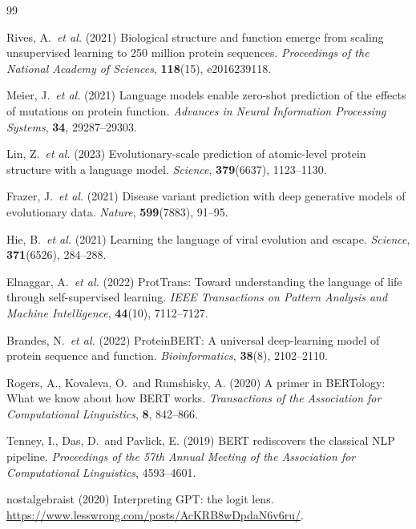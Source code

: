 \documentclass[numbered,webpdf,modern,large]{oup-authoring-template}
\newcommand{\rone}[1]{#1}
\begin{document}
\newpage
\begin{thebibliography}{99}


Rives, A.\ \textit{et al.} (2021)
Biological structure and function emerge from scaling unsupervised learning to 250
million protein sequences.
\textit{Proceedings of the National Academy of Sciences}, \textbf{118}(15), e2016239118.

Meier, J.\ \textit{et al.} (2021)
Language models enable zero-shot prediction of the effects of mutations on protein
function.
\textit{Advances in Neural Information Processing Systems}, \textbf{34}, 29287--29303.

Lin, Z.\ \textit{et al.} (2023)
Evolutionary-scale prediction of atomic-level protein structure with a language model.
\textit{Science}, \textbf{379}(6637), 1123--1130.

Frazer, J.\ \textit{et al.} (2021)
Disease variant prediction with deep generative models of evolutionary data.
\textit{Nature}, \textbf{599}(7883), 91--95.

Hie, B.\ \textit{et al.} (2021)
Learning the language of viral evolution and escape.
\textit{Science}, \textbf{371}(6526), 284--288.

Elnaggar, A.\ \textit{et al.} (2022)
ProtTrans: Toward understanding the language of life through self-supervised learning.
\textit{IEEE Transactions on Pattern Analysis and Machine Intelligence}, \textbf{44}(10),
7112--7127.

Brandes, N.\ \textit{et al.} (2022)
ProteinBERT: A universal deep-learning model of protein sequence and function.
\textit{Bioinformatics}, \textbf{38}(8), 2102--2110.

Rogers, A., Kovaleva, O.\ and Rumshisky, A. (\rone{2020})
A primer in BERTology: What we know about how BERT works.
\textit{Transactions of the Association for Computational Linguistics}, \textbf{8},
842--866.

Tenney, I., Das, D.\ and Pavlick, E. (2019)
BERT rediscovers the classical NLP pipeline.
\textit{Proceedings of the 57th Annual Meeting of the Association for Computational
Linguistics}, 4593--4601.

nostalgebraist (2020)
Interpreting GPT: the logit lens.
\url{https://www.lesswrong.com/posts/AcKRB8wDpdaN6v6ru/}.


\end{thebibliography}
\end{document}
